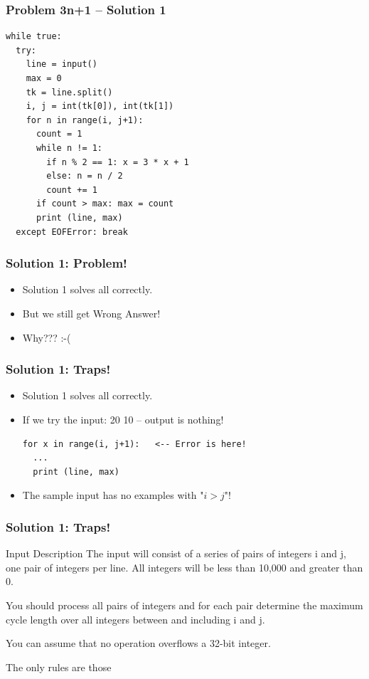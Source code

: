 \begin{frame}[fragile]
  \frametitle{Problem 3n+1 -- Solution 1}
\begin{verbatim}
while true:
  try:
    line = input()
    max = 0
    tk = line.split()
    i, j = int(tk[0]), int(tk[1])
    for n in range(i, j+1):
      count = 1
      while n != 1:
        if n % 2 == 1: x = 3 * x + 1
        else: n = n / 2
        count += 1
      if count > max: max = count
      print (line, max)
  except EOFError: break
\end{verbatim}
\end{frame}

\begin{frame}
  \frametitle{Solution 1: Problem!}

  \begin{itemize}
    \item Solution 1 solves all  correctly.
    \bigskip

    \item But we still get \alert{Wrong Answer!}
    \bigskip

    \item Why??? :-(
  \end{itemize}
\end{frame}

\begin{frame}[fragile]
  \frametitle{Solution 1: Traps!}

  \begin{itemize}
    \item Solution 1 solves all  correctly.
    \bigskip

    \item If we try the input: \alert{20 10} -- output is \alert{nothing!}
\begin{verbatim}
for x in range(i, j+1):   <-- Error is here!
  ...
  print (line, max)
\end{verbatim}
    \bigskip

    \item The sample input has \alert{no examples} with "\alert{$i > j$}"!
  \end{itemize}
\end{frame}

\begin{frame}
  \frametitle{Solution 1: Traps!}

    \begin{block}{Input Description}
    The input will consist of a series of \alert{pairs of integers} i and j, one pair of
    integers per line. All integers will be \alert{less than 10,000 and greater than 0.}

    \bigskip

    You should process all pairs of integers and for each pair determine the maximum
    cycle length over \alert{all integers between and including i and j}.

    \bigskip

    You can \alert{assume that no operation overflows a 32-bit integer}.
    \end{block}
    \bigskip

    The only rules are those 
\end{frame}


